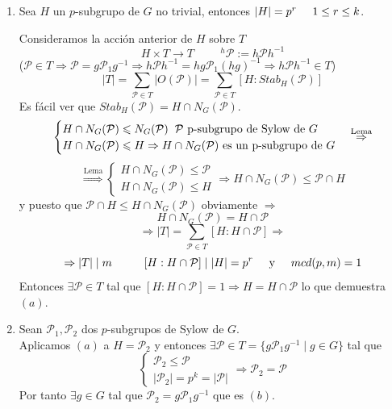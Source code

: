 \documentclass[11pt,a4paper]{article}
\begin{document}
\begin{enumerate}[label = (\alph*)]
\item Sea $H$ un $p$-subgrupo de $G$ no trivial, entonces $|H| = p^{r} \hspace{0.5cm} 1 \leq r \leq k$.

Consideramos la acción anterior de $H$ sobre $T$
$$H \times T \to T \hspace{1cm} ^{h} \mathcal{P} := h \mathcal{P} h^{-1}$$
($\mathcal{P} \in T \Rightarrow \mathcal{P} = g \mathcal{P}_{1} g^{-1} \Rightarrow h \mathcal{P} h^{-1} = hg \mathcal{P}_{1} (hg)^{-1} \Rightarrow h \mathcal{P} h^{-1} \in T$)
$$|T| = \sum_{\mathcal{P} \in T} |O(\mathcal{P})| = \sum_{\mathcal{P} \in T} [H:Stab_{H}(\mathcal{P})]$$
Es fácil ver que $Stab_{H}(\mathcal{P}) = H \cap N_{G}(\mathcal{P})$.
$$\begin{cases}
H \cap N_{G}(\mathcal{P}) \leqslant N_{G}(\mathcal{P}) \hspace{0.2cm} \mathcal{P} \text{ p-subgrupo de Sylow de } G \\
H \cap N_{G}(\mathcal{P}) \leqslant H \Rightarrow H \cap N_{G}(\mathcal{P}) \text{ es un p-subgrupo de } G
\end{cases}
\overset{\text{Lema}}{\Rightarrow}
$$ $$
\overset{\text{Lema}}{\Rightarrow}
\begin{cases}
H \cap N_{G}(\mathcal{P}) \leqslant \mathcal{P} \\
H \cap N_{G}(\mathcal{P}) \leqslant H
\end{cases}
\Rightarrow H \cap N_{G}(\mathcal{P}) \leqslant \mathcal{P} \cap H$$
y puesto que $\mathcal{P} \cap H \leqslant H \cap N_{G}(\mathcal{P})$ obviamente $\Rightarrow$
$$H \cap N_{G}(\mathcal{P}) = H \cap \mathcal{P}$$
$$\Rightarrow |T| = \sum_{\mathcal{P} \in T} [H : H \cap \mathcal{P}] \Rightarrow$$
$$\Rightarrow |T| \mid m \hspace{1cm} [H : H \cap \mathcal{P}] \mid |H| = p^{r} \hspace{0.5cm} \text{y} \hspace{0.5cm} mcd(p, m) = 1$$
Entonces $\exists \mathcal{P} \in T$ tal que $[H : H \cap \mathcal{P}] = 1 \Rightarrow H = H \cap \mathcal{P}$ lo que demuestra $(a)$.

\item Sean $\mathcal{P}_{1}, \mathcal{P}_{2}$ dos $p$-subgrupos de Sylow de $G$. \\
Aplicamos $(a)$ a $H = \mathcal{P}_{2}$ y entonces $\exists \mathcal{P} \in T = \{g \mathcal{P}_{1} g^{-1} \mid g \in G\}$ tal que
$$\begin{cases}
\mathcal{P}_{2} \leqslant \mathcal{P} \\
|\mathcal{P}_{2}| = p^{k} = |\mathcal{P}|
\end{cases}
\Rightarrow \mathcal{P}_{2} = \mathcal{P}$$
Por tanto $\exists g \in G$ tal que $\mathcal{P}_{2} = g \mathcal{P}_{1} g^{-1}$ que es $(b)$.


\end{enumerate}
\end{document}
